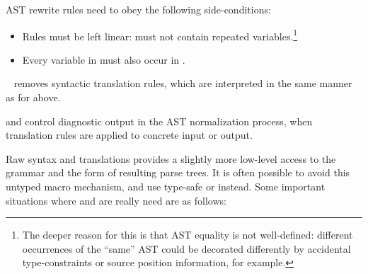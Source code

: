 \begin{isabellebody}
\begin{isamarkuptext}
\begin{description}
  AST rewrite rules  need to obey the following
  side-conditions:

  \begin{itemize}

  \item Rules must be left linear:  must not contain
  repeated variables.\footnote{The deeper reason for this is that AST
  equality is not well-defined: different occurrences of the ``same''
  AST could be decorated differently by accidental type-constraints or
  source position information, for example.}

  \item Every variable in  must also occur in .

  \end{itemize}

  \item \hyperlink{command.no-translations}{\mbox{}}~ removes syntactic
  translation rules, which are interpreted in the same manner as for
  \hyperlink{command.translations}{\mbox{}} above.

  \item \hyperlink{attribute.syntax-ast-trace}{\mbox{}} and \hyperlink{attribute.syntax-ast-stats}{\mbox{}} control diagnostic output in the AST normalization
  process, when translation rules are applied to concrete input or
  output.

  \end{description}

  Raw syntax and translations provides a slightly more low-level
  access to the grammar and the form of resulting parse trees.  It is
  often possible to avoid this untyped macro mechanism, and use
  type-safe \hyperlink{command.abbreviation}{\mbox{}} or \hyperlink{command.notation}{\mbox{}} instead.
  Some important situations where \hyperlink{command.syntax}{\mbox{}} and \hyperlink{command.translations}{\mbox{}} are really need are as follows:


\end{isamarkuptext}
\end{isabellebody}
